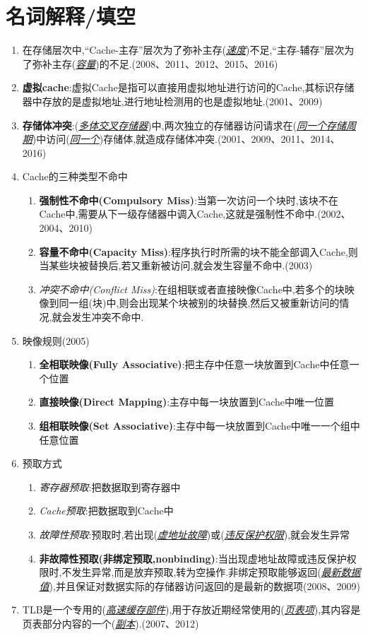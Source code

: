 \documentclass[a4paper]{ctexbook}
\newcommand{\blank}[1]{(\emph{\underline{#1}})}
\begin{document}
\section{名词解释/填空}
\begin{enumerate}
  \item 在存储层次中,“Cache-主存”层次为了弥补主存\blank{速度}不足,“主存-辅存”层次为了弥补主存\blank{容量}的不足.(2008、2011、2012、2015、2016)
  \item \textbf{虚拟cache}:虚拟Cache是指可以直接用虚拟地址进行访问的Cache,其标识存储器中存放的是虚拟地址,进行地址检测用的也是虚拟地址.(2001、2009)
  \item \textbf{存储体冲突}:\blank{多体交叉存储器}中,两次独立的存储器访问请求在\blank{同一个存储周期}中访问\blank{同一个}存储体,就造成存储体冲突.(2001、2009、2011、2014、2016)
  \item Cache的三种类型不命中
  \begin{enumerate}
    \item \textbf{强制性不命中(Compulsory Miss)}:当第一次访问一个块时,该块不在Cache中,需要从下一级存储器中调入Cache,这就是强制性不命中.(2002、2004、2010)
    \item \textbf{容量不命中(Capacity Miss)}:程序执行时所需的块不能全部调入Cache,则当某些块被替换后,若又重新被访问,就会发生容量不命中.(2003)
    \item \emph{冲突不命中(Conflict Miss)}:在组相联或者直接映像Cache中,若多个的块映像到同一组(块)中,则会出现某个块被别的块替换,然后又被重新访问的情况,就会发生冲突不命中.
  \end{enumerate}
  \item 映像规则(2005)
  \begin{enumerate}
    \item \textbf{全相联映像(Fully Associative)}:把主存中任意一块放置到Cache中任意一个位置
    \item \textbf{直接映像(Direct Mapping)}:主存中每一块放置到Cache中唯一位置
    \item \textbf{组相联映像(Set Associative)}:主存中每一块放置到Cache中唯一一个组中任意位置
  \end{enumerate}
  \item 预取方式
  \begin{enumerate}
    \item \emph{寄存器预取}:把数据取到寄存器中
    \item \emph{Cache预取}:把数据取到Cache中
    \item \emph{故障性预取}:预取时,若出现\blank{虚地址故障}或\blank{违反保护权限},就会发生异常
    \item \textbf{非故障性预取(非绑定预取,nonbinding)}:当出现虚地址故障或违反保护权限时,不发生异常,而是放弃预取,转为空操作.非绑定预取能够返回\blank{最新数据值},并且保证对数据实际的存储器访问返回的是最新的数据项(2008、2009)
  \end{enumerate}
  \item TLB是一个专用的(\emph{\underline{高速缓存部件}}),用于存放近期经常使用的(\emph{\underline{页表项}}),其内容是页表部分内容的一个(\emph{\underline{副本}}).(2007、2012)
\end{enumerate}
\end{document}
